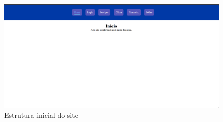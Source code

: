 \documentclass[a4paper]{abntex2}
\begin{document}
\begin{figure}[H]
    \centering
    \includegraphics[width=1.0\linewidth]{imagens/estrutura-inicial-projeto.png}
    \caption{Estrutura inicial do site}
    \label{fig:estrutura-inicial-projeto}
\end{figure}
\end{document}
